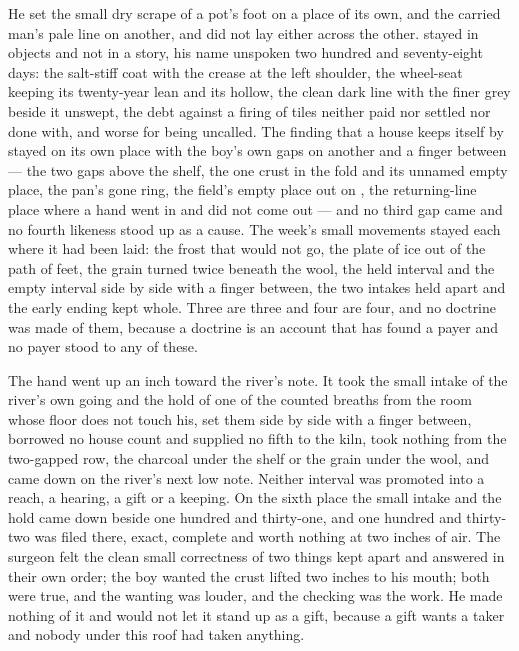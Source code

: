 He set the small dry scrape of a pot's foot on a place of its own, and the carried man's pale line on another, and did not lay either across the other.  stayed in objects and not in a story, his name unspoken two hundred and seventy-eight days: the salt-stiff coat with the crease at the left shoulder, the wheel-seat keeping its twenty-year lean and its hollow, the clean dark line with the finer grey beside it unswept, the debt against a firing of tiles neither paid nor settled nor done with, and worse for being uncalled. The finding that a house keeps itself by  stayed on its own place with the boy's own gaps on another and a finger between --- the two gaps above the shelf, the one crust in the fold and its unnamed empty place, the pan's gone ring, the field's empty place out on , the returning-line place where a hand went in and did not come out --- and no third gap came and no fourth likeness stood up as a cause. The week's small movements stayed each where it had been laid: the frost that would not go, the plate of ice out of the path of feet, the grain turned twice beneath the wool, the held interval and the empty interval side by side with a finger between, the two intakes held apart and the early ending kept whole. Three are three and four are four, and no doctrine was made of them, because a doctrine is an account that has found a payer and no payer stood to any of these.

The hand went up an inch toward the river's note. It took the small intake of the river's own going and the hold of one of the counted breaths from the room whose floor does not touch his, set them side by side with a finger between, borrowed no house count and supplied no fifth to the kiln, took nothing from the two-gapped row, the charcoal under the shelf or the grain under the wool, and came down on the river's next low note. Neither interval was promoted into a reach, a hearing, a gift or a keeping. On the sixth place the small intake and the hold came down beside one hundred and thirty-one, and one hundred and thirty-two was filed there, exact, complete and worth nothing at two inches of air. The surgeon felt the clean small correctness of two things kept apart and answered in their own order; the boy wanted the crust lifted two inches to his mouth; both were true, and the wanting was louder, and the checking was the work. He made nothing of it and would not let it stand up as a gift, because a gift wants a taker and nobody under this roof had taken anything.

